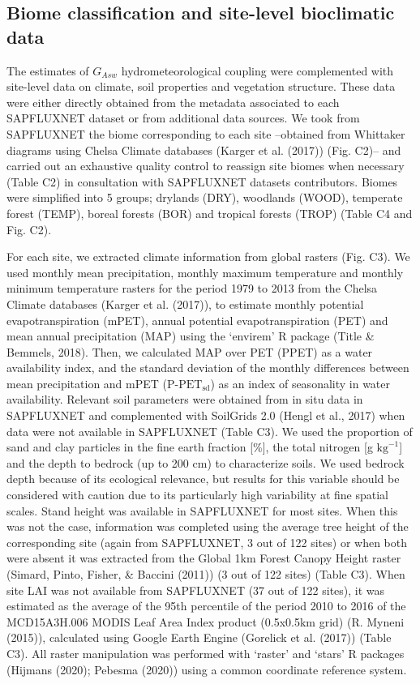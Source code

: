 \documentclass[11pt,twoside]{reedthesis}
\begin{document}
\subsection{Biome classification and site-level bioclimatic
data}\label{biome-classification-and-site-level-bioclimatic-data}

The estimates of \(G_{Asw}\) hydrometeorological coupling were
complemented with site-level data on climate, soil properties and
vegetation structure. These data were either directly obtained from the
metadata associated to each SAPFLUXNET dataset or from additional data
sources. We took from SAPFLUXNET the biome corresponding to each site
--obtained from Whittaker diagrams using Chelsa Climate databases
(Karger et al. (2017)) (Fig. C2)-- and carried out an exhaustive quality
control to reassign site biomes when necessary (Table C2) in
consultation with SAPFLUXNET datasets contributors. Biomes were
simplified into 5 groups; drylands (DRY), woodlands (WOOD), temperate
forest (TEMP), boreal forests (BOR) and tropical forests (TROP) (Table
C4 and Fig. C2).\par

For each site, we extracted climate information from global rasters
(Fig. C3). We used monthly mean precipitation, monthly maximum
temperature and monthly minimum temperature rasters for the period 1979
to 2013 from the Chelsa Climate databases (Karger et al. (2017)), to
estimate monthly potential evapotranspiration (mPET), annual potential
evapotranspiration (PET) and mean annual precipitation (MAP) using the
`envirem' R package (Title \& Bemmels, 2018). Then, we calculated MAP
over PET (PPET) as a water availability index, and the standard
deviation of the monthly differences between mean precipitation and mPET
(\(\text{P-PET}_{\text{sd}}\)) as an index of seasonality in water
availability. Relevant soil parameters were obtained from in situ data
in SAPFLUXNET and complemented with SoilGrids 2.0 (Hengl et al., 2017)
when data were not available in SAPFLUXNET (Table C3). We used the
proportion of sand and clay particles in the fine earth fraction
{[}\%{]}, the total nitrogen {[}g \(\text{kg}^{-1}\){]} and the depth to
bedrock (up to 200 cm) to characterize soils. We used bedrock depth
because of its ecological relevance, but results for this variable
should be considered with caution due to its particularly high
variability at fine spatial scales. Stand height was available in
SAPFLUXNET for most sites. When this was not the case, information was
completed using the average tree height of the corresponding site (again
from SAPFLUXNET, 3 out of 122 sites) or when both were absent it was
extracted from the Global 1km Forest Canopy Height raster (Simard,
Pinto, Fisher, \& Baccini (2011)) (3 out of 122 sites) (Table C3). When
site LAI was not available from SAPFLUXNET (37 out of 122 sites), it was
estimated as the average of the 95th percentile of the period 2010 to
2016 of the MCD15A3H.006 MODIS Leaf Area Index product (0.5x0.5km grid)
(R. Myneni (2015)), calculated using Google Earth Engine (Gorelick et
al. (2017)) (Table C3). All raster manipulation was performed with
`raster' and `stars' R packages (Hijmans (2020); Pebesma (2020)) using a
common coordinate reference system.\par
\end{document}
